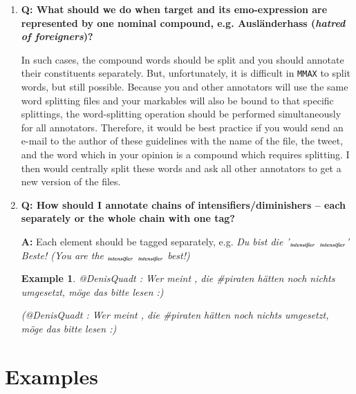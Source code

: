 \documentclass[11pt,a4paper]{article}
\theoremstyle{mytheoremstyle}
\newtheorem{exmp}{Example}[section]
\newcommand{\mtag}[2]{{\upshape[\emph{#2}\upshape]$_{\textrm{\bfseries\emph{\tiny
        #1}}}$}}
\newcommand{\intensifier}[2][]{\mtag{in\-ten\-si\-fier\ifstrempty{#1}{}{:#1}}{#2}}
\begin{document}
\begin{enumerate}
\textbf{A:} No.  While it is surely true that a sentiment always
requires a target according to our definition, emotional expressions
can be any words or phrases that have a positive or negative
connotation.  So, for example, words like \textit{Erfolg}
(\textit{success}), \textit{Missgeschick} (\textit{misfortune}),
\textit{ver\"argert} (\textit{upset}) all can be considered as
emo-expressions if you think that there are positive or negative
feelings associated with them.

\item\textbf{Q: What should we do when target and its emo-expression
  are represented by one nominal compound, e.g. Ausl\"anderhass
  (\textit{hatred of foreigners})?}

In such cases, the compound words should be split and you should
annotate their constituents separately.  But, unfortunately, it is
difficult in \texttt{MMAX} to split words, but still possible.
Because you and other annotators will use the same word splitting
files and your markables will also be bound to that specific
splittings, the word-splitting operation should be performed
simultaneously for all annotators.  Therefore, it would be best
practice if you would send an e-mail to the author of these guidelines
with the name of the file, the tweet, and the word which in your
opinion is a compound which requires splitting.  I then would
centrally split these words and ask all other annotators to get a new
version of the files.

\item\textbf{Q: How should I annotate chains of
  intensifiers/diminishers -- each separately or the whole chain with
  one tag?}

  \textbf{A:} Each element should be tagged separately,
  e.g. \textit{Du bist die '\intensifier{aller} \intensifier{aller}'
    Beste! (You are the \intensifier{very} \intensifier{very} best!)}

\begin{exmp}
  @DenisQuadt : Wer meint , die \#piraten h\"atten noch nichts
  umgesetzt, m\"oge das bitte lesen :)

{\footnotesize(@DenisQuadt : Wer meint , die \#piraten h\"atten noch
  nichts umgesetzt, m\"oge das bitte lesen :)}\label{exmp:no-emoexpr}
\end{exmp}

\end{enumerate}

\section{Examples}\label{sec:examples}
\end{document}
